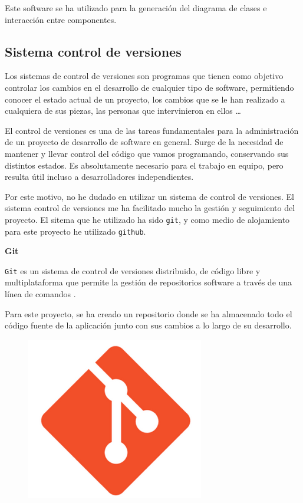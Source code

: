 Este software se ha utilizado para la generación del diagrama de clases e interacción entre componentes.

\newpage

\subsection{Sistema control de versiones}

Los sistemas de control de versiones \cite{ref9} son programas que tienen como objetivo controlar los cambios en el desarrollo de cualquier tipo de software, permitiendo conocer el estado actual de un proyecto, los cambios que se le han realizado a cualquiera de sus piezas, las personas que intervinieron en ellos \ldots

El control de versiones es una de las tareas fundamentales para la administración de un proyecto de desarrollo de software en general. Surge de la necesidad de mantener y llevar control del código que vamos programando, conservando sus distintos estados. Es absolutamente necesario para el trabajo en equipo, pero resulta útil incluso a desarrolladores independientes. 

Por este motivo, no he dudado en utilizar un sistema de control de versiones. El sistema control de versiones me ha facilitado mucho la gestión y seguimiento del proyecto. El sitema que he utilizado ha sido \texttt{git}, y como medio de alojamiento para este proyecto he utilizado  \texttt{github}.

\textbf{Git}

\texttt{Git} \cite{ref10}  es un sistema de control de versiones distribuido, de código libre y multiplataforma que permite la gestión de repositorios software a través de una línea de comandos \cite{ref9}.

Para este proyecto, se ha creado un repositorio donde se ha almacenado todo el código fuente de la aplicación junto con sus cambios a lo largo de su desarrollo.

\begin{figure}[h]
	\centering
	\includegraphics[scale=0.25]{images/6}
\end{figure}


